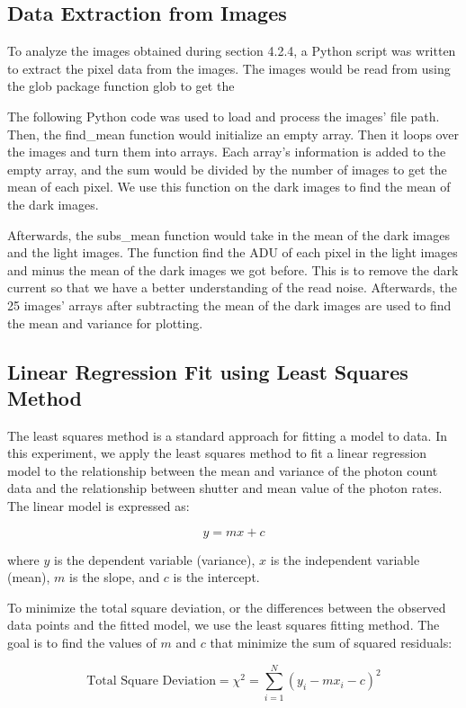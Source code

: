 \documentclass[10pt, preprint]{aastex}
\begin{document}
\subsection{Data Extraction from Images}

To analyze the images obtained during section 4.2.4, a Python script was written to extract the pixel data from the images. The images would be read from using the glob package function glob to get the 

The following Python code was used to load and process the images' file path. Then, the find\_mean function would initialize an empty array. Then it loops over the images and turn them into arrays. Each array's information is added to the empty array, and the sum would be divided by the number of images to get the mean of each pixel. We use this function on the dark images to find the mean of the dark images.

Afterwards, the subs\_mean function would take in the mean of the dark images and the light images. The function find the ADU of each pixel in the light images and minus the mean of the dark images we got before. This is to remove the dark current so that we have a better understanding of the read noise. Afterwards, the 25 images' arrays after subtracting the mean of the dark images are used to find the mean and variance for plotting.

\subsection{Linear Regression Fit using Least Squares Method}

The least squares method is a standard approach for fitting a model to data. In this experiment, we apply the least squares method to fit a linear regression model to the relationship between the mean and variance of the photon count data and the relationship between shutter and mean value of the photon rates. The linear model is expressed as:

\[
y = mx + c
\]

where $y$ is the dependent variable (variance), $x$ is the independent variable (mean), $m$ is the slope, and $c$ is the intercept.

To minimize the total square deviation, or the differences between the observed data points and the fitted model, we use the least squares fitting method. The goal is to find the values of $m$ and $c$ that minimize the sum of squared residuals:

\[
\text{Total Square Deviation} = \chi^2 = \sum_{i=1}^{N} (y_i - mx_i - c)^2
\]
\end{document}
